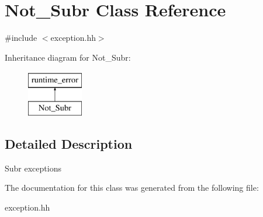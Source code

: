 \hypertarget{classNot__Subr}{\section{Not\-\_\-\-Subr Class Reference}
\label{classNot__Subr}
}


{\ttfamily \#include $<$exception.\-hh$>$}

Inheritance diagram for Not\-\_\-\-Subr\-:\begin{figure}[H]
\begin{center}
\leavevmode
\includegraphics[height=2.000000cm]{classNot__Subr}
\end{center}
\end{figure}


\subsection{Detailed Description}
Subr exceptions 

The documentation for this class was generated from the following file\-:\begin{DoxyCompactItemize}
\item 
exception.\-hh\end{DoxyCompactItemize}
